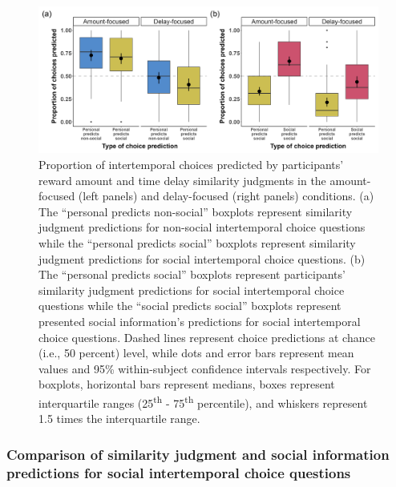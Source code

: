 \documentclass[
  pub,floatsintext]{apa6}
\begin{document}
\begin{figure}
\includegraphics[width=1\linewidth]{figures/sim_judgment_predictions_combined_1} \caption{Proportion of intertemporal choices predicted by participants' reward amount and time delay similarity judgments in the amount-focused (left panels) and delay-focused (right panels) conditions. (a) The ``personal predicts non-social'' boxplots represent similarity judgment predictions for non-social intertemporal choice questions while the ``personal predicts social'' boxplots represent similarity judgment predictions for social intertemporal choice questions. (b) The ``personal predicts social'' boxplots represent participants' similarity judgment predictions for social intertemporal choice questions while the ``social predicts social'' boxplots represent presented social information's predictions for social intertemporal choice questions. Dashed lines represent choice predictions at chance (i.e., 50 percent) level, while dots and error bars represent mean values and 95\% within-subject confidence intervals respectively. For boxplots, horizontal bars represent medians, boxes represent interquartile ranges (25\textsuperscript{th} - 75\textsuperscript{th} percentile), and whiskers represent 1.5 times the interquartile range.}\label{fig:simjudgmentsocialinfopredictions1}
\end{figure}

\hypertarget{comparison-of-similarity-judgment-and-social-information-predictions-for-social-intertemporal-choice-questions}{%
\subsubsection{Comparison of similarity judgment and social information predictions for social intertemporal choice questions}\label{comparison-of-similarity-judgment-and-social-information-predictions-for-social-intertemporal-choice-questions}}
\end{document}
